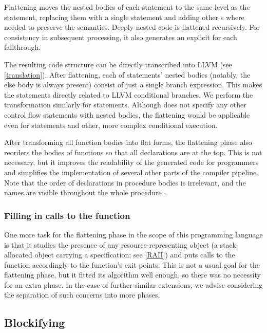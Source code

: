 Flattening moves the nested bodies of each  statement to the same level as the  statement, replacing them with a single  statement and adding other s where needed to preserve the semantics. Deeply nested code is flattened recursively. For consistency in subsequent processing, it also generates an explicit  for each fallthrough.

The resulting code structure can be directly transcribed into LLVM (see \cref{translation}). After flattening, each of  statements' nested bodies (notably, the else body is always present) consist of just a single branch expression. This makes the  statements directly related to LLVM conditional branches. We perform the transformation similarly for  statements. Although \cmm does not specify any other control flow statements with nested bodies, the flattening would be applicable even for  statements and other, more complex conditional execution.

After transforming all function bodies into flat forms, the flattening phase also reorders the bodies of functions so that all declarations are at the top. This is not necessary, but it improves the readability of the generated code for programmers and simplifies the implementation of several other parts of the compiler pipeline. Note that the order of declarations in procedure bodies is irrelevant, and the names are visible throughout the whole procedure \cite{ramsey2005c}.

\subsubsection{Filling in calls to the  function}

One more task for the flattening phase in the scope of this programming language is that it studies the presence of any resource-representing object (a stack-allocated object carrying a  specification; see \cref{RAII}) and puts calls to the  function accordingly to the function's exit points. This is not a usual goal for the flattening phase, but it fitted its algorithm well enough, so there was no necessity for an extra phase. In the case of further similar extensions, we advise considering the separation of such concerns into more phases.

\subsection{Blockifying}
\label{sec:blockify}

